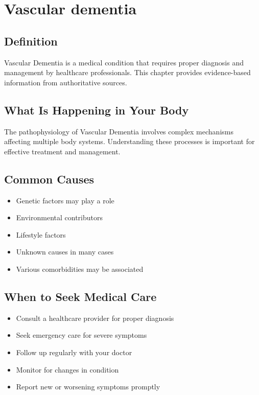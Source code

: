 
\chapter{Vascular dementia}

\section*{Definition}
Vascular Dementia is a medical condition that requires proper diagnosis and management by healthcare professionals. This chapter provides evidence-based information from authoritative sources.

\section*{What Is Happening in Your Body}
The pathophysiology of Vascular Dementia involves complex mechanisms affecting multiple body systems. Understanding these processes is important for effective treatment and management.

\section*{Common Causes}
\begin{itemize}
  \item Genetic factors may play a role
  \item Environmental contributors
  \item Lifestyle factors
  \item Unknown causes in many cases
  \item Various comorbidities may be associated
\end{itemize}

\section*{When to Seek Medical Care}
\begin{itemize}
  \item Consult a healthcare provider for proper diagnosis
  \item Seek emergency care for severe symptoms
  \item Follow up regularly with your doctor
  \item Monitor for changes in condition
  \item Report new or worsening symptoms promptly
\end{itemize}

